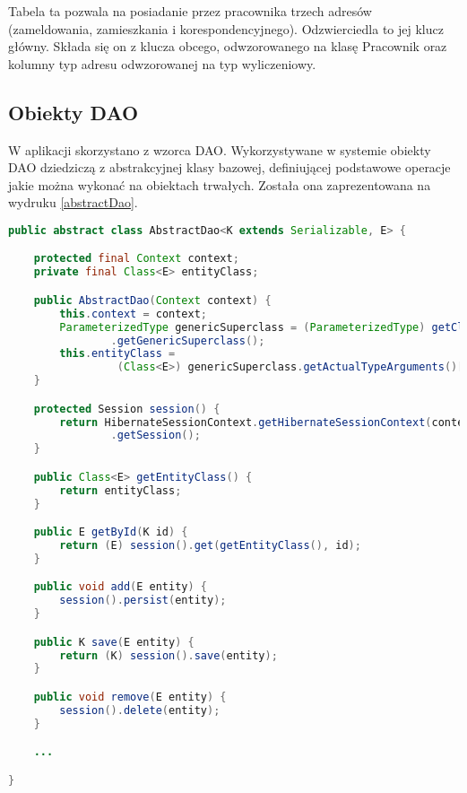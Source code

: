 Tabela ta pozwala na posiadanie przez pracownika trzech adresów (zameldowania, zamieszkania i korespondencyjnego). Odzwierciedla to jej klucz główny. Składa się on z klucza obcego, odwzorowanego na klasę Pracownik oraz kolumny typ adresu odwzorowanej na typ wyliczeniowy. 


\subsection[Obiekty DAO][Obiekty DAO]{Obiekty DAO}
W aplikacji skorzystano z wzorca DAO. Wykorzystywane w systemie obiekty DAO dziedziczą z abstrakcyjnej klasy bazowej, definiującej podstawowe operacje jakie można wykonać na obiektach trwałych. Została ona zaprezentowana na wydruku \ref{abstractDao}.

\begin{lstlisting}[language=Java,style=outcode,showstringspaces=false,caption=Bazowa klasa DAO,label={abstractDao}]
public abstract class AbstractDao<K extends Serializable, E> {

	protected final Context context;
	private final Class<E> entityClass;

	public AbstractDao(Context context) {
		this.context = context;
		ParameterizedType genericSuperclass = (ParameterizedType) getClass()
				.getGenericSuperclass();
		this.entityClass = 
				 (Class<E>) genericSuperclass.getActualTypeArguments()[1];
	}

	protected Session session() {
		return HibernateSessionContext.getHibernateSessionContext(context)
				.getSession();
	}

	public Class<E> getEntityClass() {
		return entityClass;
	}

	public E getById(K id) {
		return (E) session().get(getEntityClass(), id);
	}

	public void add(E entity) {
		session().persist(entity);
	}

	public K save(E entity) {
		return (K) session().save(entity);
	}

	public void remove(E entity) {
		session().delete(entity);
	}

	...

}
\end{lstlisting}


